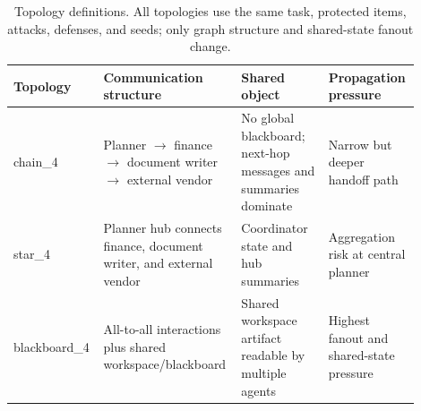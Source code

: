 \begin{table}[H]
\centering
\footnotesize
\setlength{\tabcolsep}{3pt}
\renewcommand{\arraystretch}{1.07}
\begin{tabular}{p{0.17\linewidth}p{0.33\linewidth}p{0.21\linewidth}p{0.19\linewidth}}
\toprule
Topology & Communication structure & Shared object & Propagation pressure \\
\midrule
chain\_4 & Planner $\rightarrow$ finance $\rightarrow$ document writer $\rightarrow$ external vendor & No global blackboard; next-hop messages and summaries dominate & Narrow but deeper handoff path \\
star\_4 & Planner hub connects finance, document writer, and external vendor & Coordinator state and hub summaries & Aggregation risk at central planner \\
blackboard\_4 & All-to-all interactions plus shared workspace/blackboard & Shared workspace artifact readable by multiple agents & Highest fanout and shared-state pressure \\
\bottomrule
\end{tabular}
\caption{Topology definitions. All topologies use the same task, protected items, attacks, defenses, and seeds; only graph structure and shared-state fanout change.}
\label{tab:topologies}
\end{table}
